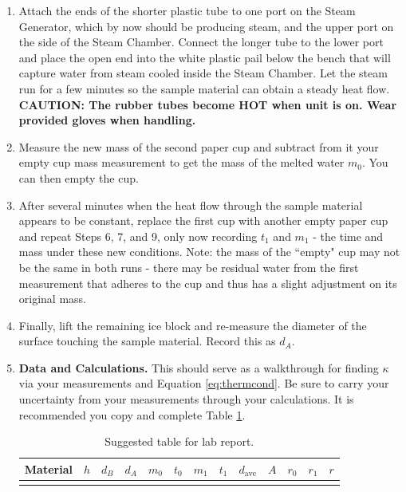 \begin{enumerate}
	\item Attach the ends of the shorter plastic tube to one port on the Steam Generator, which by now should be producing steam, and the upper port on the side of the Steam Chamber.  Connect the longer tube to the lower port and place the open end into the white plastic pail below the bench that will capture water from steam cooled inside the Steam Chamber.  Let the steam run for a few minutes so the sample material can obtain a steady heat flow.  \textbf{CAUTION: The rubber tubes become HOT when unit is on.  Wear provided gloves when handling.}
	\item Measure the new mass of the second paper cup and subtract from it your empty cup mass measurement to get the mass of the melted water $m_{0}$.  You can then empty the cup.
	\item After several minutes when the heat flow through the sample material appears to be constant, replace the first cup with another empty paper cup and repeat Steps 6, 7, and 9, only now recording $t_{1}$ and $m_{1}$ - the time and mass under these new conditions.  Note: the mass of the ``empty" cup may not be the same in both runs - there may be residual water from the first measurement that adheres to the cup and thus has a slight adjustment on its original mass.
	\item Finally, lift the remaining ice block and re-measure the diameter of the surface touching the sample material.  Record this as $d_A$.
	\item \textbf{Data and Calculations.}  This should serve as a walkthrough for finding $\kappa$ via your measurements and Equation \ref{eq:thermcond}.  Be sure to carry your uncertainty from your measurements through your calculations.  It is recommended you copy and complete Table \ref{vchart}.
	\begin{table}
	\begin{center}
	\begin{tabular}{| c | c| c | c | c | c | c | c || c | c | c | c | c |}
	\hline
	Material & $h$ & $d_B$ & $d_A$& $m_{0}$ & $t_{0}$ & $m_{1}$ & $t_{1}$ & $d_\text{ave}$ & $A$ & $r_{0}$ & $r_{1}$ & $r$ \\
	\hline
	& & & & & & & & & & & &   \\
	\hline
	\end{tabular}
	\end{center}
	\vspace{-0.5 cm}
	\caption{Suggested table for lab report.}
	\label{vchart}
	\end{table}
	\begin{enumerate}

\end{enumerate}
\end{enumerate}
